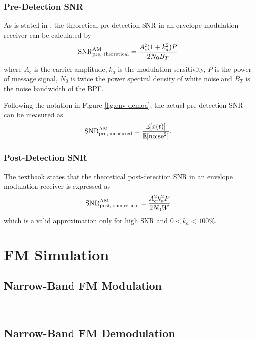 \documentclass[../ECE459FinalProjectReport.tex]{subfiles}
\begin{document}
\subsubsection{Pre-Detection SNR}
As is stated in \textcite[Eq. (9.26)]{haykinIntroductionAnalogDigital2007}, the theoretical pre-detection SNR in an envelope modulation receiver can be calculated by
\begin{equation}
  \text{SNR}_{\text{pre, theoretical}}^{\text{AM}} = \frac{A_c^2 (1+k_a^2)P}{2N_0 B_T}
\end{equation}
where $A_c$ is the carrier amplitude, $k_a$ is the modulation sensitivity, $P$ is the power of message signal, $N_0$ is twice the power spectral density of white noise and $B_T$ is the noise bandwidth of the BPF.

Following the notation in Figure \ref{fig:env-demod}, the actual pre-detection SNR can be measured as
\begin{equation}
    \text{SNR}_{\text{pre, measured}}^{\text{AM}} = \frac{\mathbb{E}[x(t)]}{\mathbb{E}[\text{noise}^2]}.
\end{equation}

\subsubsection{Post-Detection SNR}

The textbook \cite[Eq. (9.23)]{haykinIntroductionAnalogDigital2007} states that the theoretical post-detection SNR in an envelope modulation receiver is expressed as
\begin{equation}
    \text{SNR}_{\text{post, theoretical}}^{\text{AM}} = \frac{A_c^2 k_a^2 P}{2N_0 W}
\end{equation}
which is a valid approximation only for high SNR and $0<k_a<100\%$. 



\section{FM Simulation}
\subsection{Narrow-Band FM Modulation}
~
\subsection{Narrow-Band FM Demodulation}
~
\end{document}
